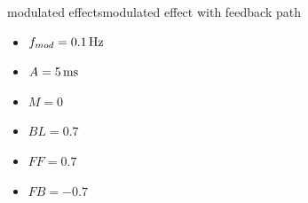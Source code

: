 \begin{frame}{modulated effects}{modulated effect with feedback path}
{				\vspace{-8mm}
				\begin{itemize}
					\item	$f_{mod} = \unit[0.1]{Hz}$
					\item	$ A = \unit[5]{ms}$
					\item	$ M = 0$
					\item	$BL = 0.7$
					\item	$FF = 0.7$
					\item	$FB = -0.7$
				\end{itemize}
			}
		\end{frame}


